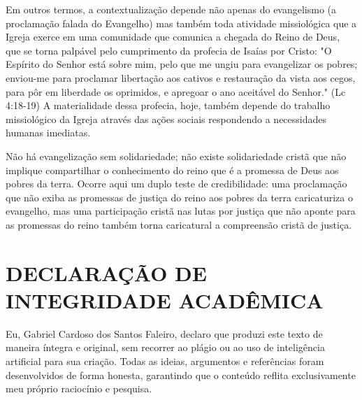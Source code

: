 \documentclass[
    article,            %
	12pt,				%
	oneside,			%
	a4paper,			%
	chapter=TITLE,		%
	section=TITLE,		%
	english,			%
	french,				%
	spanish,			%
	brazil				%
	]{abntex2}
\begin{document}
Em outros termos, a contextualização depende não apenas do evangelismo (a proclamação falada do Evangelho) mas também toda atividade missiológica que a Igreja exerce em uma comunidade que comunica a chegada do Reino de Deus, que se torna palpável pelo cumprimento da profecia de Isaías por Cristo: "O Espírito do Senhor está sobre mim, pelo que me ungiu para evangelizar os pobres; enviou-me para proclamar libertação aos cativos e restauração da vista aos cegos, para pôr em liberdade os oprimidos, e apregoar o ano aceitável do Senhor." (Lc 4:18-19) A materialidade dessa profecia, hoje, também depende do trabalho missiológico da Igreja através das ações sociais respondendo a necessidades humanas imediatas.
\begin{citacao}
Não há evangelização sem solidariedade; não existe solidariedade cristã que não implique compartilhar o conhecimento do reino que é a promessa de Deus aos pobres da terra. Ocorre aqui um duplo teste de credibilidade: uma proclamação que não exiba as promessas de justiça do reino aos pobres da terra caricaturiza o evangelho, mas uma participação cristã nas lutas por justiça que não aponte para as promessas do reino também torna caricatural a compreensão cristã de justiça. \cite[p.488]{BOSCH}
\end{citacao}

\pagebreak
\section{DECLARAÇÃO DE INTEGRIDADE ACADÊMICA}
Eu, Gabriel Cardoso dos Santos Faleiro, declaro que produzi este texto de maneira íntegra e original, sem recorrer ao plágio ou ao uso de inteligência artificial para sua criação. Todas as ideias, argumentos e referências foram desenvolvidos de forma honesta, garantindo que o conteúdo reflita exclusivamente meu próprio raciocínio e pesquisa.
\pagebreak

\nocite{BIBLIA}
\nocite{EDILSON}
\renewcommand{\bibname}{{REFER\^ENCIAS}}

\end{document}
